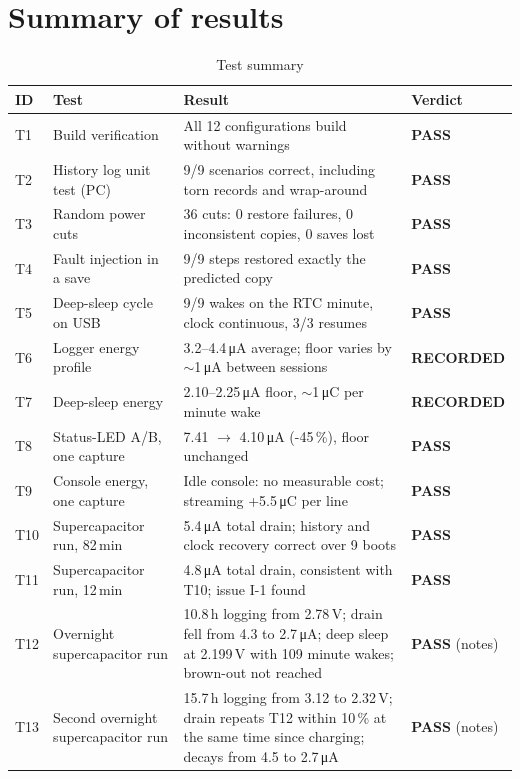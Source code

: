 \documentclass[11pt,a4paper]{article}
\newcommand{\uA}{\,\si{\micro\ampere}}
\newcommand{\uC}{\,\si{\micro\coulomb}}
\newcommand{\pass}{\textbf{\textcolor{green!45!black}{PASS}}}
\newcommand{\recorded}{\textbf{\textcolor{blue!60!black}{RECORDED}}}
\begin{document}
\section{Summary of results}
\label{sec:summary}

\begin{table}[H]
\centering\small
\caption{Test summary}
\label{tab:summary}
\begin{tabularx}{\textwidth}{@{}l>{\raggedright\arraybackslash}p{4.6cm}Ll@{}}
\toprule
ID & Test & Result & Verdict \\
\midrule
T1 & Build verification & All 12 configurations build without warnings & \pass \\
T2 & History log unit test (PC) & 9/9 scenarios correct, including torn records and wrap-around & \pass \\
T3 & Random power cuts & 36 cuts: 0 restore failures, 0 inconsistent copies, 0 saves lost & \pass \\
T4 & Fault injection in a save & 9/9 steps restored exactly the predicted copy & \pass \\
T5 & Deep-sleep cycle on USB & 9/9 wakes on the RTC minute, clock continuous, 3/3 resumes & \pass \\
T6 & Logger energy profile & 3.2--4.4\uA{} average; floor varies by $\sim$1\uA{} between sessions & \recorded \\
T7 & Deep-sleep energy & 2.10--2.25\uA{} floor, $\sim$1\uC{} per minute wake & \recorded \\
T8 & Status-LED A/B, one capture & 7.41 $\rightarrow$ 4.10\uA{} (-45\,\%), floor unchanged & \pass \\
T9 & Console energy, one capture & Idle console: no measurable cost; streaming +5.5\uC{} per line & \pass \\
T10 & Supercapacitor run, 82\,min & 5.4\uA{} total drain; history and clock recovery correct over 9 boots & \pass \\
T11 & Supercapacitor run, 12\,min & 4.8\uA{} total drain, consistent with T10; issue I-1 found & \pass \\
T12 & Overnight supercapacitor run & 10.8\,h logging from 2.78\,V; drain fell from 4.3 to 2.7\uA; deep sleep at 2.199\,V with 109 minute wakes; brown-out not reached & \pass{} (notes) \\
T13 & Second overnight supercapacitor run & 15.7\,h logging from 3.12 to 2.32\,V; drain repeats T12 within 10\,\% at the same time since charging; decays from 4.5 to 2.7\uA{} & \pass{} (notes) \\
\bottomrule
\end{tabularx}
\end{table}
\end{document}
